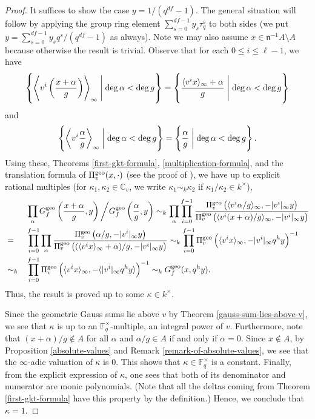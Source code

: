 \documentclass[11pt]{amsart}
\theoremstyle{plain}
\theoremstyle{definition}
\theoremstyle{remark}
\numberwithin{equation}{section}
\newcommand{\CC}{\mathbb{C}}
\newcommand{\FF}{\mathbb{F}}
\newcommand{\nfk}{\mathfrak{n}}
\newcommand{\ang}[1]{\langle #1 \rangle}
\newcommand{\anginf}[1]{\langle #1 \rangle_\infty}
\newcommand{\lranginf}[1]{\left\langle #1 \right\rangle_\infty}
\newcommand{\Fqst}{\FF_q^\times}
\newcommand{\vgf}{\Pi_v^{\textnormal{geo}}}
\newcommand{\ggsf}{G_f^{\textnormal{geo}}}
\let\l\ell
\begin{document}
	\begin{proof}
		It suffices to show the case $y = 1/(q^{df}-1)$.
		The general situation will follow by applying the group ring element $\sum_{s=0}^{df-1} y_s\tau_q^s$ to both sides (we put $y = \sum_{s=0}^{df-1} y_sq^s/(q^{df}-1)$ as always).
		Note we may also assume $x \in \nfk^{-1}A \setminus A$ because otherwise the result is trivial.
		Observe that for each $0 \leq i \leq \l-1$, we have
		$$
		\left\{ \lranginf{v^i\left(\frac{x+\alpha}{g}\right)} \Biggm| \deg \alpha < \deg g \right\}
		= \left\{ \frac{\anginf{v^ix}+\alpha}{g} \Biggm| \deg \alpha < \deg g \right\}
		$$
		and
		$$
		\left\{ \lranginf{v^i \frac{\alpha}{g}} \biggm| \deg \alpha < \deg g \right\}
		= \left\{ \frac{\alpha}{g} \biggm| \deg \alpha < \deg g \right\}.
		$$
		Using these, Theorems \ref{first-gkt-formula}, \ref{multiplication-formula}, and the translation formula of $\vgf(x,\cdot)$ (see the proof of \cite[Lemma 4.6.2]{thakur2004function}), we have up to explicit rational multiples (for $\kappa_1,\kappa_2 \in \CC_v$, we write $\kappa_1 \sim_k \kappa_2$ if $\kappa_1/\kappa_2 \in k^\times$),
		\begin{alignat*}{2}
			& &&\prod_{\alpha} \ggsf\left( \frac{x+\alpha}{g},y \right) \bigg/ \ggsf\left( \frac{\alpha}{g},y \right)
			\sim_k \prod_{\alpha} \prod_{i=0}^{f-1} \frac{\vgf\left(\anginf{v^i \alpha/g},-|v^i|_\infty y\right)}{\vgf\left(\anginf{v^i(x+\alpha)/g},-|v^i|_\infty y\right)}    \\
			&= &&\prod_{i=0}^{f-1} \prod_{\alpha} \frac{\vgf\left(\alpha/g,-|v^i|_\infty y\right)}{\vgf\left((\anginf{v^ix}+\alpha)/g,-|v^i|_\infty y\right)}
			\sim_k \prod_{i=0}^{f-1} \vgf\left(\anginf{v^ix},-|v^i|_\infty q^hy\right)^{-1}   \\
			&\sim_k &&\prod_{i=0}^{f-1} \vgf\left(\anginf{v^ix}, -\ang{|v^i|_\infty q^hy}\right)^{-1}
			\sim_k \ggsf(x,q^hy).
		\end{alignat*}
		Thus, the result is proved up to some $\kappa \in k^\times$.
		
		Since the geometric Gauss sums lie above $v$ by Theorem \ref{gauss-sum-lies-above-v}, we see that $\kappa$ is up to an $\Fqst$-multiple, an integral power of $v$.
		Furthermore, note that $(x+\alpha)/g \notin A$ for all $\alpha$ and $\alpha/g \in A$ if and only if $\alpha=0$.
		Since $x \notin A$, by Proposition \ref{absolute-values} and Remark \ref{remark-of-absolute-values}, we see that the $\infty$-adic valuation of $\kappa$ is $0$.
		This shows that $\kappa \in \Fqst$ is a constant.
		Finally, from the explicit expression of $\kappa$, one sees that both of its denominator and numerator are monic polynomials.
		(Note that all the deltas coming from Theorem \ref{first-gkt-formula} have this property by the definition.)
		Hence, we conclude that $\kappa = 1$.
	\end{proof}
	
\end{document}

